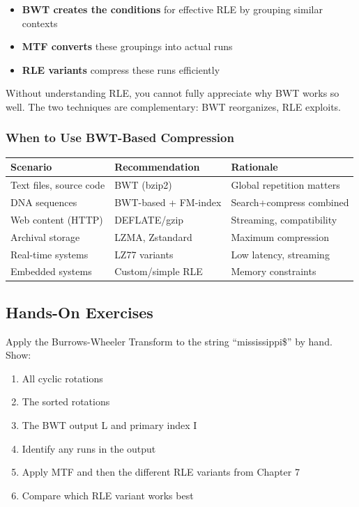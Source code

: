 \begin{itemize}
    \item \textbf{BWT creates the conditions} for effective RLE by grouping similar contexts
    \item \textbf{MTF converts} these groupings into actual runs
    \item \textbf{RLE variants} compress these runs efficiently
\end{itemize}

Without understanding RLE, you cannot fully appreciate why BWT works so well. The two techniques are complementary: BWT reorganizes, RLE exploits.

\subsubsection{When to Use BWT-Based Compression}

\begin{center}
\begin{tabularx}{\textwidth}{@{}l X X@{}}
\toprule
\textbf{Scenario} & \textbf{Recommendation} & \textbf{Rationale} \\
\midrule
Text files, source code & BWT (bzip2) & Global repetition matters \\
DNA sequences & BWT-based + FM-index & Search+compress combined \\
Web content (HTTP) & DEFLATE/gzip & Streaming, compatibility \\
Archival storage & LZMA, Zstandard & Maximum compression \\
Real-time systems & LZ77 variants & Low latency, streaming \\
Embedded systems & Custom/simple RLE & Memory constraints \\
\bottomrule
\end{tabularx}
\end{center}

\subsection{Hands-On Exercises}

\begin{exercisebox}
Apply the Burrows-Wheeler Transform to the string ``mississippi\$'' by hand. Show:
\begin{enumerate}
    \item All cyclic rotations
    \item The sorted rotations
    \item The BWT output L and primary index I
    \item Identify any runs in the output
    \item Apply MTF and then the different RLE variants from Chapter 7
    \item Compare which RLE variant works best
\end{enumerate}
\end{exercisebox}

